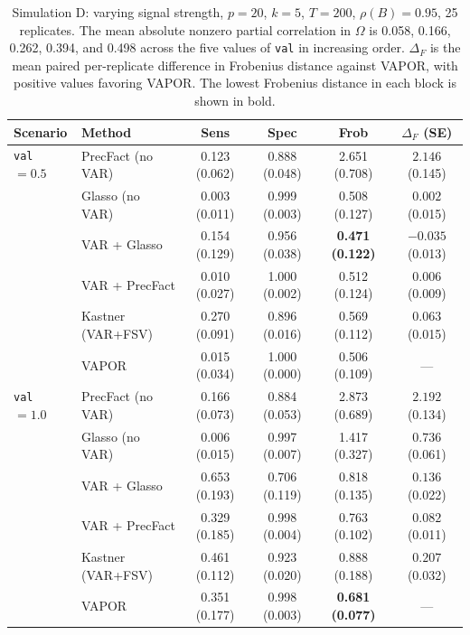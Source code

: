 \begin{table}[h!]
\centering
\small
\setlength{\tabcolsep}{3.5pt}
\caption{Simulation D: varying signal strength, $p=20$, $k=5$, $T=200$, $\rho(B)=0.95$, 25 replicates. The mean absolute nonzero partial correlation in $\Omega$ is 0.058, 0.166, 0.262, 0.394, and 0.498 across the five values of \texttt{val} in increasing order. $\Delta_F$ is the mean paired per-replicate difference in Frobenius distance against VAPOR, with positive values favoring VAPOR. The lowest Frobenius distance in each block is shown in bold.}
\label{tab:sim-d}
\begin{tabular}{llcccc}
\toprule
Scenario & Method & Sens & Spec & Frob & $\Delta_F$ (SE) \\
\midrule
\texttt{val} $= 0.5$ & PrecFact (no VAR)  & 0.123 (0.062) & 0.888 (0.048) & 2.651 (0.708) & $2.146$ (0.145) \\
                     & Glasso (no VAR)    & 0.003 (0.011) & 0.999 (0.003) & 0.508 (0.127) & $0.002$ (0.015) \\
                     & VAR + Glasso       & 0.154 (0.129) & 0.956 (0.038) & \textbf{0.471 (0.122)} & $-0.035$ (0.013) \\
                     & VAR + PrecFact     & 0.010 (0.027) & 1.000 (0.002) & 0.512 (0.124) & $0.006$ (0.009) \\
                     & Kastner (VAR+FSV)  & 0.270 (0.091) & 0.896 (0.016) & 0.569 (0.112) & $0.063$ (0.015) \\
                     & VAPOR              & 0.015 (0.034) & 1.000 (0.000) & 0.506 (0.109) & --- \\
\midrule
\texttt{val} $= 1.0$ & PrecFact (no VAR)  & 0.166 (0.073) & 0.884 (0.053) & 2.873 (0.689) & $2.192$ (0.134) \\
                     & Glasso (no VAR)    & 0.006 (0.015) & 0.997 (0.007) & 1.417 (0.327) & $0.736$ (0.061) \\
                     & VAR + Glasso       & 0.653 (0.193) & 0.706 (0.119) & 0.818 (0.135) & $0.136$ (0.022) \\
                     & VAR + PrecFact     & 0.329 (0.185) & 0.998 (0.004) & 0.763 (0.102) & $0.082$ (0.011) \\
                     & Kastner (VAR+FSV)  & 0.461 (0.112) & 0.923 (0.020) & 0.888 (0.188) & $0.207$ (0.032) \\
                     & VAPOR              & 0.351 (0.177) & 0.998 (0.003) & \textbf{0.681 (0.077)} & --- \\
\midrule

\end{tabular}
\end{table}
